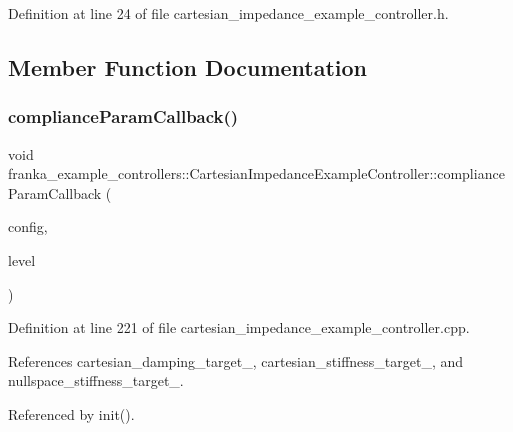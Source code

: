 Definition at line 24 of file cartesian\+\_\+impedance\+\_\+example\+\_\+controller.\+h.



\subsection{Member Function Documentation}
\mbox{\label{classfranka__example__controllers_1_1CartesianImpedanceExampleController_a31f27ea8c8f60f073fb50c78cf48ab6c}} 
\subsubsection{\texorpdfstring{compliance\+Param\+Callback()}{complianceParamCallback()}}
{\footnotesize\ttfamily void franka\+\_\+example\+\_\+controllers\+::\+Cartesian\+Impedance\+Example\+Controller\+::compliance\+Param\+Callback (\begin{DoxyParamCaption}\item[{franka\+\_\+example\+\_\+controllers\+::compliance\+\_\+param\+Config \&}]{config,  }\item[{uint32\+\_\+t}]{level }\end{DoxyParamCaption})\hspace{0.3cm}{\ttfamily [private]}}



Definition at line 221 of file cartesian\+\_\+impedance\+\_\+example\+\_\+controller.\+cpp.



References cartesian\+\_\+damping\+\_\+target\+\_\+, cartesian\+\_\+stiffness\+\_\+target\+\_\+, and nullspace\+\_\+stiffness\+\_\+target\+\_\+.



Referenced by init().


